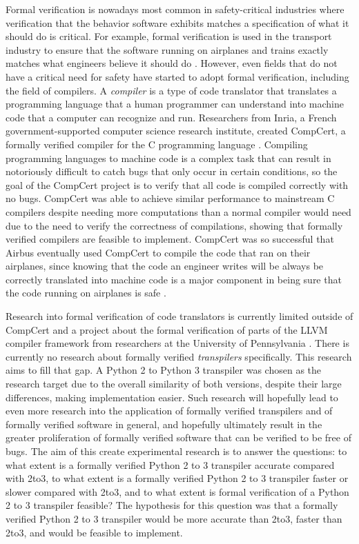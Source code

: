 Formal verification is nowadays most common in safety-critical industries where verification that the behavior software exhibits matches a specification of what it should do is critical. For example, formal verification is used in the transport industry to ensure that the software running on airplanes and trains exactly matches what engineers believe it should do \autocite{Woodcock}. However, even fields that do not have a critical need for safety have started to adopt formal verification, including the field of compilers. A \textit{compiler} is a type of code translator that translates a programming language that a human programmer can understand into machine code that a computer can recognize and run. Researchers from Inria, a French government-supported computer science research institute, created CompCert, a formally verified compiler for the C programming language \autocite{Leroy}. Compiling programming languages to machine code is a complex task that can result in notoriously difficult to catch bugs that only occur in certain conditions, so the goal of the CompCert project is to verify that all code is compiled correctly with no bugs. CompCert was able to achieve similar performance to mainstream C compilers despite needing more computations than a normal compiler would need due to the need to verify the correctness of compilations, showing that formally verified compilers are feasible to implement. CompCert was so successful that Airbus eventually used CompCert to compile the code that ran on their airplanes, since knowing that the code an engineer writes will be always be correctly translated into machine code is a major component in being sure that the code running on airplanes is safe \autocite{Souyris}.

Research into formal verification of code translators is currently limited outside of CompCert and a project about the formal verification of parts of the LLVM compiler framework from researchers at the University of Pennsylvania \autocite{Leroy}\autocite{Zhao}. There is currently no research about formally verified \textit{transpilers} specifically. This research aims to fill that gap. A Python 2 to Python 3 transpiler was chosen as the research target due to the overall similarity of both versions, despite their large differences, making implementation easier. Such research will hopefully lead to even more research into the application of formally verified transpilers and of formally verified software in general, and hopefully ultimately result in the greater proliferation of formally verified software that can be verified to be free of bugs. The aim of this create experimental research is to answer the questions: to what extent is a formally verified Python 2 to 3 transpiler accurate compared with 2to3, to what extent is a formally verified Python 2 to 3 transpiler faster or slower compared with 2to3, and to what extent is formal verification of a Python 2 to 3 transpiler feasible? The hypothesis for this question was that a formally verified Python 2 to 3 transpiler would be more accurate than 2to3, faster than 2to3, and would be feasible to implement.